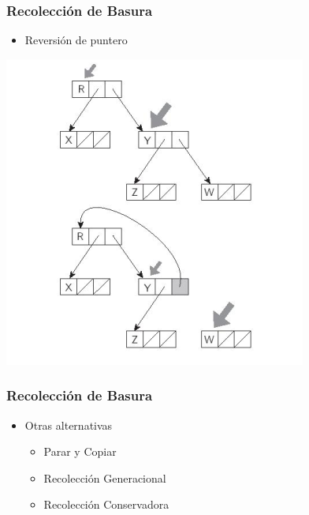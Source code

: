 \documentclass[11pt]{article}
\begin{document}
\subsubsection*{Recolección de Basura}
\label{sec:orgheadline17}
\begin{itemize}
\item Reversión de puntero
\end{itemize}

\includegraphics[width=.9\linewidth]{reversepoint.png} 

\subsubsection*{Recolección de Basura}
\label{sec:orgheadline18}
\begin{itemize}
\item Otras alternativas
\begin{itemize}
\item Parar y Copiar
\item Recolección Generacional
\item Recolección Conservadora
\end{itemize}
\end{itemize}
\end{document}
